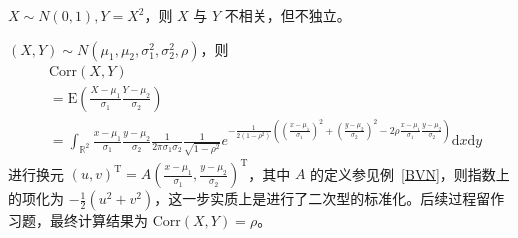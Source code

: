 \documentclass[../main.tex]{subfiles}
\begin{document}
\begin{example}
$X\sim N(0,1),Y=X^2$，则 $X$ 与 $Y$ 不相关，但不独立。
\end{example}



\begin{example}
$(X,Y)\sim N(\mu_1,\mu_2,\sigma_1^2,\sigma_2^2,\rho)$，则
    \begin{equation}
    \begin{aligned}
    &\mathrm{Corr}(X,Y)\nonumber\\
    &=\mathrm E(\frac{X-\mu_1}{\sigma_1}\frac{Y-\mu_2}{\sigma_2})\nonumber\\
    &=\int_{\mathbb R^2}\frac{x-\mu_1}{\sigma_1}\frac{y-\mu_2}{\sigma_2}\frac{1}{2\pi\sigma_1\sigma_2}\frac{1}{\sqrt{1-\rho^2}}e^{-\frac{1}{2(1-\rho^2)}((\frac{x-\mu_1}{\sigma_1})^2+(\frac{y-\mu_2}{\sigma_2})^2-2\rho\frac{x-\mu_1}{\sigma_1}\frac{y-\mu_2}{\sigma_2})}\mathrm dx\mathrm dy\nonumber
    \end{aligned}
    \end{equation}
进行换元 $(u,v)^\mathrm T=A(\frac{x-\mu_1}{\sigma_1},\frac{y-\mu_2}{\sigma_2})^\mathrm T$，其中 $A$ 的定义参见例~\ref{BVN}，则指数上的项化为 $-\frac12(u^2+v^2)$，这一步实质上是进行了二次型的标准化。后续过程留作习题，最终计算结果为 $\mathrm{Corr}(X,Y)=\rho$。
\end{example}
\end{document}

